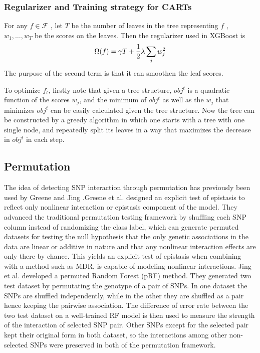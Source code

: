 \documentclass[11pt]{article}
\theoremstyle{plain}
\theoremstyle{definition}
\theoremstyle{remark}
\begin{document}
\subsubsection{Regularizer and Training strategy for CARTs}

For any $f\in\mathcal{F}$ , let $T$ be the number of leaves in the tree representing $f$ , $w_1,\dots, w_T$ be the scores on
the leaves. Then the regularizer used in XGBoost is
\begin{equation}
\Omega(f)=\gamma T+{1\over 2}\lambda\sum_j w_j^2
\end{equation}
The purpose of the second term is that it can smoothen the leaf scores.

To optimize $f_t$, firstly note that given a tree structure, $obj^t$ is a quadratic function of the scores $w_j$,
and the minimum of $obj^t$ as well as the $w_j$ that minimizes $obj^t$ can be easily calculated given the tree structure. Now the tree can be constructed by a greedy algorithm in which one starts with a tree with
one single node, and repeatedly split its leaves in a way that maximizes the decrease in $obj^t$ in each step.

\subsection{Permutation}

The idea of detecting SNP interaction through permutation has previously been used by Greene \cite{10}
and Jing \cite{2}.Greene et al. designed an explicit test of epistasis to reflect only nonlinear interaction
or epistasis component of the model. They advanced the traditional permutation testing framework
by shuffling each SNP column instead of randomizing the class label, which can generate permuted
datasets for testing the null hypothesis that the only genetic associations in the data are linear or
additive in nature and that any nonlinear interaction effects are only there by chance. This yields an
explicit test of epistasis when combining with a method such as MDR, is capable of modeling
nonlinear interactions. Jing et al. developed a permuted Random Forest (pRF) method. They
generated two test dataset by permutating the genotype of a pair of SNPs. In one dataset the SNPs
are shuffled independently, while in the other they are shuffled as a pair hence keeping the pairwise
association. The difference of error rate between the two test dataset on a well-trained RF model is
then used to measure the strength of the interaction of selected SNP pair. Other SNPs except for the
selected pair kept their original form in both dataset, so the interactions among other non-selected
SNPs were preserved in both of the permutation framework.\\
\end{document}
